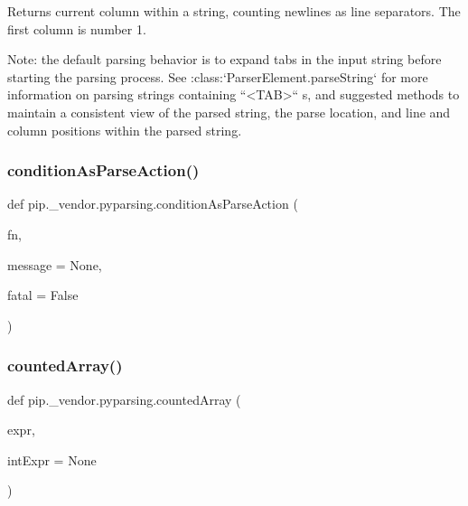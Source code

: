 \begin{DoxyVerb}Returns current column within a string, counting newlines as line separators.
   The first column is number 1.

   Note: the default parsing behavior is to expand tabs in the input string
   before starting the parsing process.  See
   :class:`ParserElement.parseString` for more
   information on parsing strings containing ``<TAB>`` s, and suggested
   methods to maintain a consistent view of the parsed string, the parse
   location, and line and column positions within the parsed string.\end{DoxyVerb}
 \mbox{\label{namespacepip_1_1__vendor_1_1pyparsing_aa03cee88987045f2dfc3051da2ef3c94}} 
\subsubsection{\texorpdfstring{condition\+As\+Parse\+Action()}{conditionAsParseAction()}}
{\footnotesize\ttfamily def pip.\+\_\+vendor.\+pyparsing.\+condition\+As\+Parse\+Action (\begin{DoxyParamCaption}\item[{}]{fn,  }\item[{}]{message = {\ttfamily None},  }\item[{}]{fatal = {\ttfamily False} }\end{DoxyParamCaption})}

\mbox{\label{namespacepip_1_1__vendor_1_1pyparsing_a816c52a4cc16b28c70763dd61e83db71}} 
\subsubsection{\texorpdfstring{counted\+Array()}{countedArray()}}
{\footnotesize\ttfamily def pip.\+\_\+vendor.\+pyparsing.\+counted\+Array (\begin{DoxyParamCaption}\item[{}]{expr,  }\item[{}]{int\+Expr = {\ttfamily None} }\end{DoxyParamCaption})}

